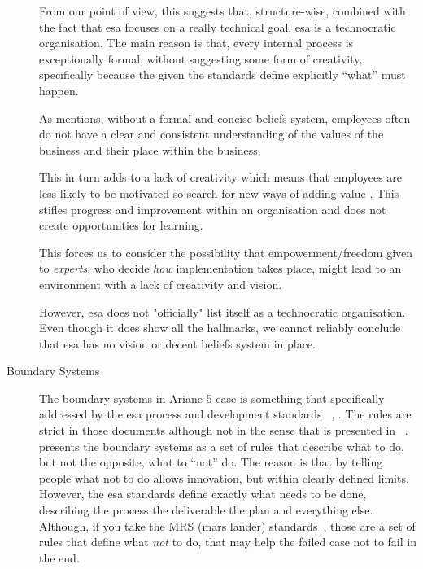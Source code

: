\begin{description}
From our point of view, this suggests that, structure-wise, combined with the fact that \ac{esa} focuses on a really technical goal, \ac{esa} is a technocratic organisation. The main reason is that, every internal process is exceptionally formal, without suggesting some form of creativity, specifically because the given the standards define explicitly ``what'' must happen.

As \citep{simons1995control} mentions, without a formal and concise beliefs system, employees often do not have a clear and consistent understanding of the values of the business and their place within the business. 

This in turn adds to a lack of creativity which means that employees are less likely to be motivated so search for new ways of adding value \citep[83]{simons1995control}. This stifles progress and improvement within an organisation and does not create opportunities for learning.

This forces us to consider the possibility that empowerment/freedom given to \textit{experts}, who decide \textit{how} implementation takes place, might lead to an environment with a lack of creativity and vision.

However, \ac{esa} does not "officially" list itself as a technocratic organisation. Even though it does show all the hallmarks, we cannot reliably conclude that \ac{esa} has no vision or decent beliefs system in place.

\item[Boundary Systems]
The boundary systems in Ariane 5 case is something that specifically addressed by the \ac{esa} process and development standards ~\citep{jones1997esa}, \citep{secretariat1996space}. The rules are strict in those documents although not in the sense that is presented in ~\citep{simons1995control}. \citep{simons1995control} presents the boundary systems as a set of rules that describe what to do, but not the opposite, what to ``not'' do. The reason is that by telling people what not to do allows innovation, but within clearly defined limits. However, the \ac{esa} standards define exactly what needs to be done, describing the process the deliverable the plan and everything else. Although, if you take the MRS (mars lander) standards~\citep{holzmann2006power}, those are a set of rules that define what \textit{not} to do, that may help the failed case not to fail in the end.


\end{description}
